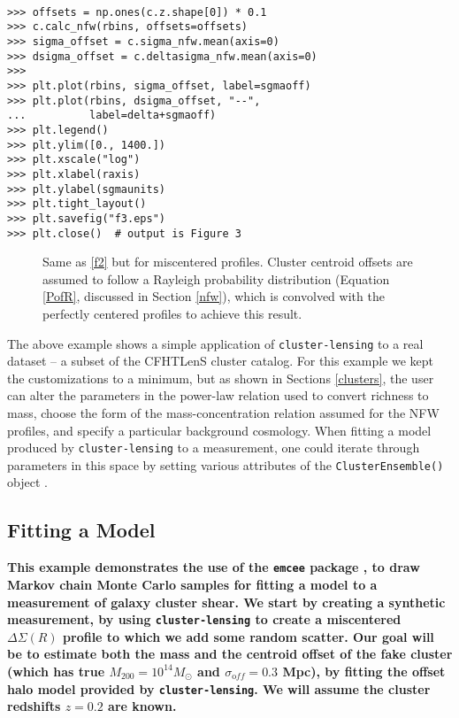 \documentclass[twocolumn]{aastex6}
\newcommand{\code}{\lstinline[style=codeintext]}
\begin{document}
\pagebreak

\begin{verbatim}

>>> offsets = np.ones(c.z.shape[0]) * 0.1
>>> c.calc_nfw(rbins, offsets=offsets)
>>> sigma_offset = c.sigma_nfw.mean(axis=0)
>>> dsigma_offset = c.deltasigma_nfw.mean(axis=0)
>>> 
>>> plt.plot(rbins, sigma_offset, label=sgmaoff)
>>> plt.plot(rbins, dsigma_offset, "--",
...          label=delta+sgmaoff)
>>> plt.legend()
>>> plt.ylim([0., 1400.])
>>> plt.xscale("log")
>>> plt.xlabel(raxis)
>>> plt.ylabel(sgmaunits)
>>> plt.tight_layout()
>>> plt.savefig("f3.eps")
>>> plt.close()  # output is Figure 3

\end{verbatim}
\begin{figure}
\caption{Same as \cref{f2} but for miscentered profiles. Cluster centroid offsets are assumed to follow a Rayleigh probability distribution (Equation \ref{PofR}, discussed in Section \ref{nfw}), which is convolved with the perfectly centered profiles to achieve this result.}
\label{f3}
\end{figure}

\pagebreak

The above example shows a simple application of \code{cluster-lensing} to a real dataset -- a subset of the CFHTLenS cluster catalog.  For this example we kept the customizations to a minimum, but as shown in Sections \ref{clusters}, the user can alter the parameters in the power-law relation used to convert richness to mass, choose the form of the mass-concentration relation assumed for the NFW profiles, and specify a particular background cosmology. When fitting a model produced by \code{cluster-lensing} to a measurement, one could iterate through parameters in this space by setting various attributes of the \code{ClusterEnsemble()} object \citep[as done, e.g. in][]{Ford14, Ford15}.


\subsection{Fitting a Model}
\label{emcee_ex}
{\bf This example demonstrates the use of the \code{emcee} package \citep{emcee}, to draw Markov chain Monte Carlo samples for fitting a model to a measurement of galaxy cluster shear. We start by creating a synthetic measurement, by using \code{cluster-lensing} to create a miscentered $\Delta\Sigma(R)$ profile to which we add some random scatter. Our goal will be to estimate both the mass and the centroid offset of the fake cluster (which has true $M_{200} = 10^{14} M_{\odot}$ and $\sigma_{\mathrm off} = 0.3$ Mpc), by fitting the offset halo model provided by \code{cluster-lensing}. We will assume the cluster redshifts $z = 0.2$ are known.}
\end{document}
